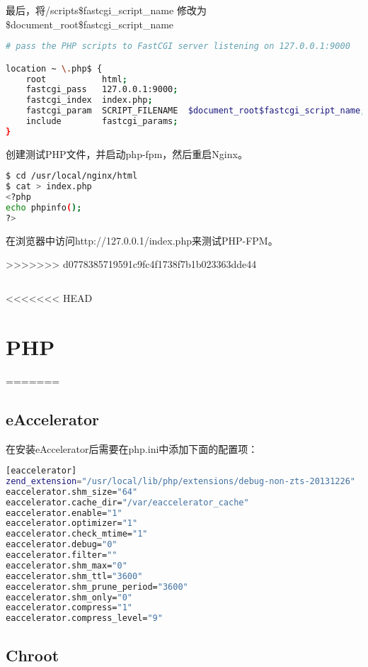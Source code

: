 最后，将/scripts\$fastcgi\_script\_name 修改为 \$document\_root\$fastcgi\_script\_name

\begin{lstlisting}[language=bash]
# pass the PHP scripts to FastCGI server listening on 127.0.0.1:9000

location ~ \.php$ {
    root           html;
    fastcgi_pass   127.0.0.1:9000;
    fastcgi_index  index.php;
    fastcgi_param  SCRIPT_FILENAME  $document_root$fastcgi_script_name;
    include        fastcgi_params;
}
\end{lstlisting}

创建测试PHP文件，并启动php-fpm，然后重启Nginx。


\begin{lstlisting}[language=bash]
$ cd /usr/local/nginx/html
$ cat > index.php
<?php
echo phpinfo();
?>

\end{lstlisting}

在浏览器中访问http://127.0.0.1/index.php来测试PHP-FPM。

>>>>>>> d0778385719591c9fc4f1738f7b1b023363dde44


\begin{lstlisting}[language=bash]

\end{lstlisting}


<<<<<<< HEAD
\section{PHP}
=======
\subsection{eAccelerator}

在安装eAccelerator后需要在php.ini中添加下面的配置项：

\begin{lstlisting}[language=bash]
[eaccelerator]
zend_extension="/usr/local/lib/php/extensions/debug-non-zts-20131226"
eaccelerator.shm_size="64"
eaccelerator.cache_dir="/var/eaccelerator_cache"
eaccelerator.enable="1"
eaccelerator.optimizer="1"
eaccelerator.check_mtime="1"
eaccelerator.debug="0"
eaccelerator.filter=""
eaccelerator.shm_max="0"
eaccelerator.shm_ttl="3600"
eaccelerator.shm_prune_period="3600"
eaccelerator.shm_only="0"
eaccelerator.compress="1"
eaccelerator.compress_level="9"
\end{lstlisting}




\subsection{Chroot}


